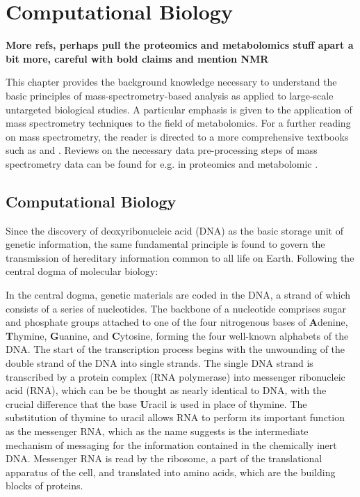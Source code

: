 \chapter{Computational Biology}
\label{c:background}


\textbf{More refs, perhaps pull the proteomics and metabolomics stuff apart a bit more, careful with bold claims and mention NMR}

This chapter provides the background knowledge necessary to understand the basic principles of mass-spectrometry-based analysis as applied to large-scale untargeted biological studies. A particular emphasis is given to the application of mass spectrometry techniques to the field of metabolomics. For a further reading on mass spectrometry, the reader is directed to a more comprehensive textbooks such as \cite{Hoffmann2007} and \cite{gross2006mass}. Reviews on the necessary data pre-processing steps of mass spectrometry data can be found for e.g. in proteomics \cite{Megger2013, Sandin2014, Smith2014} and metabolomic \cite{Castillo2011,Manuscript2013,Gika2014}.

\section{Computational Biology}

Since the discovery of deoxyribonucleic acid (DNA) as the basic storage unit of genetic information, the same fundamental principle is found to govern the transmission of hereditary information common to all life on Earth. Following the central dogma of molecular biology:
\begin{center}\end{center}
In the central dogma, genetic materials are coded in the DNA, a strand of which consists of a series of nucleotides. The backbone of a nucleotide comprises sugar and phosphate groups attached to one of the four nitrogenous bases of \textbf{A}denine, \textbf{T}hymine, \textbf{G}uanine, and \textbf{C}ytosine, forming the four well-known alphabets of the DNA. The start of the transcription process begins with the unwounding of the double strand of the DNA into single strands. The single DNA strand is transcribed by a protein complex (RNA polymerase) into messenger ribonucleic acid (RNA), which can be be thought as nearly identical to DNA, with the crucial difference that the base \textbf{U}racil is used in place of thymine. The substitution of thymine to uracil allows RNA to perform its important function as the messenger RNA, which as the name suggests is the intermediate mechanism of messaging for the information contained in the chemically inert DNA. Messenger RNA is read by the ribosome, a part of the translational apparatus of the cell, and translated into amino acids, which are the building blocks of proteins. 

